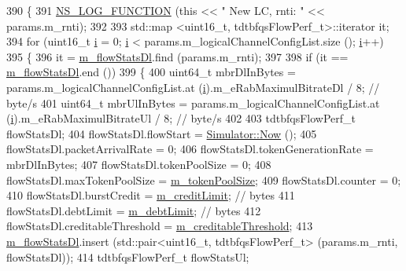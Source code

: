 \begin{DoxyCode}
390 \{
391   \hyperlink{log-macros-disabled_8h_a90b90d5bad1f39cb1b64923ea94c0761}{NS\_LOG\_FUNCTION} (\textcolor{keyword}{this} << \textcolor{stringliteral}{" New LC, rnti: "}  << params.m\_rnti);
392 
393   std::map <uint16\_t, tdtbfqsFlowPerf\_t>::iterator it;
394   \textcolor{keywordflow}{for} (uint16\_t \hyperlink{bernuolliDistribution_8m_a6f6ccfcf58b31cb6412107d9d5281426}{i} = 0; \hyperlink{bernuolliDistribution_8m_a6f6ccfcf58b31cb6412107d9d5281426}{i} < params.m\_logicalChannelConfigList.size (); \hyperlink{bernuolliDistribution_8m_a6f6ccfcf58b31cb6412107d9d5281426}{i}++)
395     \{
396       it = \hyperlink{classns3_1_1TdTbfqFfMacScheduler_a077474dfdd0b794b6e274954e049e0c4}{m\_flowStatsDl}.find (params.m\_rnti);
397 
398       \textcolor{keywordflow}{if} (it == \hyperlink{classns3_1_1TdTbfqFfMacScheduler_a077474dfdd0b794b6e274954e049e0c4}{m\_flowStatsDl}.end ())
399         \{
400           uint64\_t mbrDlInBytes = params.m\_logicalChannelConfigList.at (\hyperlink{bernuolliDistribution_8m_a6f6ccfcf58b31cb6412107d9d5281426}{i}).m\_eRabMaximulBitrateDl / 8;   \textcolor{comment}{
      // byte/s}
401           uint64\_t mbrUlInBytes = params.m\_logicalChannelConfigList.at (\hyperlink{bernuolliDistribution_8m_a6f6ccfcf58b31cb6412107d9d5281426}{i}).m\_eRabMaximulBitrateUl / 8;   \textcolor{comment}{
      // byte/s}
402 
403           tdtbfqsFlowPerf\_t flowStatsDl;
404           flowStatsDl.flowStart = \hyperlink{classns3_1_1Simulator_ac3178fa975b419f7875e7105be122800}{Simulator::Now} ();
405           flowStatsDl.packetArrivalRate = 0;
406           flowStatsDl.tokenGenerationRate =  mbrDlInBytes;
407           flowStatsDl.tokenPoolSize = 0;
408           flowStatsDl.maxTokenPoolSize = \hyperlink{classns3_1_1TdTbfqFfMacScheduler_ac14d4dbc811afa558ad1b7fc125b188b}{m\_tokenPoolSize};
409           flowStatsDl.counter = 0;
410           flowStatsDl.burstCredit = \hyperlink{classns3_1_1TdTbfqFfMacScheduler_a4fcf66ab5e783305bad38c4667f2cfd0}{m\_creditLimit}; \textcolor{comment}{// bytes}
411           flowStatsDl.debtLimit = \hyperlink{classns3_1_1TdTbfqFfMacScheduler_a9c3d40d1117e3afd1dbb4747008d256e}{m\_debtLimit}; \textcolor{comment}{// bytes}
412           flowStatsDl.creditableThreshold = \hyperlink{classns3_1_1TdTbfqFfMacScheduler_a776a405971c9f74b3ad96379a9aa7abe}{m\_creditableThreshold};
413           \hyperlink{classns3_1_1TdTbfqFfMacScheduler_a077474dfdd0b794b6e274954e049e0c4}{m\_flowStatsDl}.insert (std::pair<uint16\_t, tdtbfqsFlowPerf\_t> (params.m\_rnti, 
      flowStatsDl));
414           tdtbfqsFlowPerf\_t flowStatsUl;

\end{DoxyCode}
